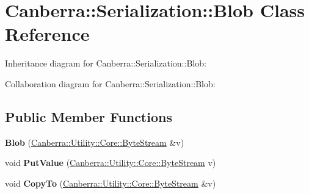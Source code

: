 \hypertarget{class_canberra_1_1_serialization_1_1_blob}{}\section{Canberra\+:\+:Serialization\+:\+:Blob Class Reference}
\label{class_canberra_1_1_serialization_1_1_blob}


Inheritance diagram for Canberra\+:\+:Serialization\+:\+:Blob\+:


Collaboration diagram for Canberra\+:\+:Serialization\+:\+:Blob\+:
\subsection*{Public Member Functions}
\begin{DoxyCompactItemize}
\item 
\mbox{\label{class_canberra_1_1_serialization_1_1_blob_a92c3a616a81c6a24f522df1a2c601ca1}} 
{\bfseries Blob} (\hyperlink{class_canberra_1_1_utility_1_1_core_1_1_byte_stream}{Canberra\+::\+Utility\+::\+Core\+::\+Byte\+Stream} \&v)
\item 
\mbox{\label{class_canberra_1_1_serialization_1_1_blob_a2836b4bead7c4583fc8397bfada74592}} 
void {\bfseries Put\+Value} (\hyperlink{class_canberra_1_1_utility_1_1_core_1_1_byte_stream}{Canberra\+::\+Utility\+::\+Core\+::\+Byte\+Stream} v)
\item 
\mbox{\label{class_canberra_1_1_serialization_1_1_blob_a01bee00d814dd21302c888b36685cfe5}} 
void {\bfseries Copy\+To} (\hyperlink{class_canberra_1_1_utility_1_1_core_1_1_byte_stream}{Canberra\+::\+Utility\+::\+Core\+::\+Byte\+Stream} \&v)
\end{DoxyCompactItemize}
